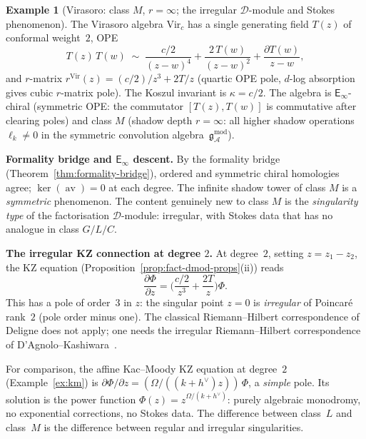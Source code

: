 \documentclass[11pt,reqno]{amsart}
\theoremstyle{definition}
\newtheorem{example}[theorem]{Example}
\theoremstyle{remark}
\newcommand{\cA}{\mathcal{A}}
\newcommand{\cD}{\mathcal{D}}
\newcommand{\Einf}{\mathsf{E}_{\infty}}
\DeclareMathOperator{\av}{av}
\newcommand{\gmod}{\mathfrak{g}^{\mathrm{mod}}_{\cA}}
\numberwithin{equation}{section}
\begin{document}

\begin{example}[Virasoro: class $M$, $r = \infty$;
the irregular $\cD$-module and Stokes phenomenon]
\label{ex:virasoro}
The Virasoro algebra $\mathrm{Vir}_c$ has a single generating
field $T(z)$ of conformal weight~$2$, OPE
\[
  T(z)\,T(w) \;\sim\;
  \frac{c/2}{(z-w)^4} + \frac{2\,T(w)}{(z-w)^2}
  + \frac{\partial T(w)}{z-w},
\]
and $r$-matrix $r^{\mathrm{Vir}}(z) = (c/2)/z^3 + 2T/z$
(quartic OPE pole, $d$-log absorption gives cubic
$r$-matrix pole).
The Koszul invariant is $\kappa = c/2$.
The algebra is $\Einf$-chiral (symmetric OPE: the commutator
$[T(z), T(w)]$ is commutative after clearing poles)
and class $M$ (shadow depth $r = \infty$: all higher shadow
operations $\ell_k \neq 0$ in the symmetric convolution
algebra~$\gmod$).

\medskip
\noindent\textbf{Formality bridge and $\Einf$ descent.}
By the formality bridge (Theorem~\ref{thm:formality-bridge}),
ordered and symmetric chiral homologies agree;
$\ker(\av) = 0$ at each degree. The infinite shadow tower of
class $M$ is a \emph{symmetric} phenomenon. The content
genuinely new to class $M$ is the \emph{singularity type}
of the factorisation $\cD$-module: irregular, with Stokes
data that has no analogue in class $G/L/C$.

\medskip
\noindent\textbf{The irregular KZ connection at degree $2$.}
At degree~$2$, setting $z = z_1 - z_2$, the KZ equation
(Proposition~\ref{prop:fact-dmod-props}(ii)) reads
\begin{equation}\label{eq:kz-vir-degree2}
  \frac{\partial\Phi}{\partial z}
  = \biggl(\frac{c/2}{z^3} + \frac{2T}{z}\biggr)\Phi.
\end{equation}
This has a pole of order~$3$ in $z$: the singular point
$z = 0$ is \emph{irregular} of Poincar\'e rank~$2$
(pole order minus one). The classical Riemann--Hilbert
correspondence of Deligne does not apply; one needs the
irregular Riemann--Hilbert correspondence of
D'Agnolo--Kashiwara~\cite{DAgnoloKashiwara16}.

For comparison, the affine Kac--Moody KZ equation at degree~$2$
(Example~\ref{ex:km}) is
$\partial\Phi/\partial z = (\Omega/((k + h^\vee)z))\,\Phi$,
a \emph{simple} pole. Its solution is the power function
$\Phi(z) = z^{\Omega/(k+h^\vee)}$:
purely algebraic monodromy, no exponential corrections,
no Stokes data. The difference between class~$L$ and
class~$M$ is the difference between regular and irregular
singularities.


\end{example}
\end{document}
